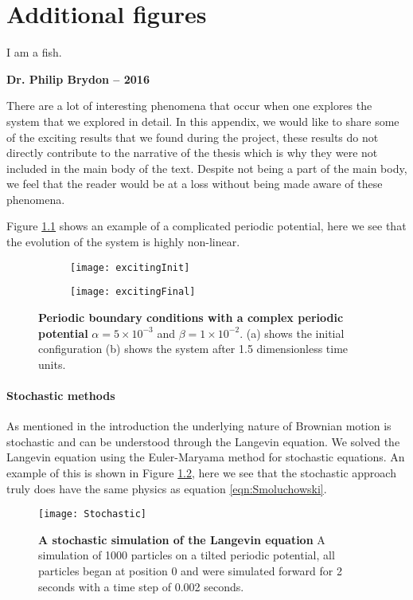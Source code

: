\chapter{Additional figures}
\setlength{}
\epigraph{I am a fish.}{\textbf{Dr. Philip Brydon -- 2016}}

There are a lot of interesting phenomena that occur when one explores the system that we explored in detail. In this appendix, we would like to share some of the exciting results that we found during the project, these results do not directly contribute to the narrative of the thesis which is why they were not included in the main body of the text. Despite not being a part of the main body, we feel that the reader would be at a loss without being made aware of these phenomena.

Figure \ref{fig:exciting} shows an example of a complicated periodic potential, here we see that the evolution of the system is highly non-linear.
\begin{figure}
	\begin{subfigure}{0.49\textwidth}
		\texttt{[image: excitingInit]}
	\end{subfigure}
	\begin{subfigure}{0.49\textwidth}
		\texttt{[image: excitingFinal]}
	\end{subfigure}
	\caption{\textbf{Periodic boundary conditions with a complex periodic potential} $\alpha = 5 \times 10^{-3}$ and $\beta = 1 \times 10^{-2}$. (a) shows the initial configuration (b) shows the system after 1.5 dimensionless time units. \label{fig:exciting}}
\end{figure}

\subsubsection{Stochastic methods}
As mentioned in the introduction the underlying nature of Brownian motion is stochastic and can be understood through the Langevin equation. We solved the Langevin equation using the Euler-Maryama method for stochastic equations. An example of this is shown in Figure \ref{fig:stochastic}, here we see that the stochastic approach truly does have the same physics as equation \ref{eqn:Smoluchowski}.


\begin{figure}
	\center
	\texttt{[image: Stochastic]}
	\caption{\textbf{A stochastic simulation of the Langevin equation} A simulation of 1000 particles on a tilted periodic potential, all particles began at position 0 and were simulated forward for 2 seconds with a time step of 0.002 seconds. \label{fig:stochastic}}
\end{figure}